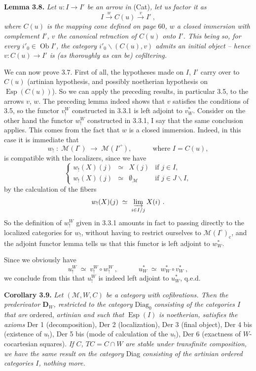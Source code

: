 \documentclass[11pt]{article}
\newcommand{\printedpage}[1]{\marginpar{\footnotesize p.~#1}}
\newcommand{\msp}[1]{\marginpar{\footnotesize [#1]}}
\newcommand{\Esp}{\operatorname{Esp}}
\newcommand{\Ob}{\operatorname{Ob}}
\newcommand{\M}{\mathcal{M}}
\begin{document}
\textbf{Lemma 3.8.} \textit{Let $u : I\longrightarrow I'$ be an arrow in} (Cat)\textit{, let us factor it as}
\[
I \xrightarrow{\;w\;} C(u) \xrightarrow{\;v\;} I'\ ,
\]
\textit{where $C(u)$ is the mapping cone defined on page} 60\textit{, $w$ a closed immersion with complement $I'$, $v$ the canonical retraction of $C(u)$ onto $I'$. This being so, for every $i'_0\in\Ob I'$, the category $i'_0\backslash(C(u),v)$ admits an initial object – hence $v : C(u)\longrightarrow I'$ is (as thoroughly as can be) cofiltering.}

We can now prove 3.7. First of all, the hypotheses made on $I$, $I'$ carry over to $C(u)$ (artinian hypothesis, and possibly noetherian hypothesis on $\Esp(C(u))$). So
\msp{page 63}
we can apply the preceding results, in particular 3.5, to the arrows $v$, $w$. The preceding lemma indeed shows that $v$ satisfies the conditions of 3.5, so the functor $v_!^W$ constructed in 3.3.1 is left adjoint to $v_W^*$. Consider on the other hand the functor $w_!^W$ constructed in 3.3.1, I say that the same conclusion applies. This comes from the fact that $w$ is a closed immersion. Indeed, in this case it is immediate that
\[
w_! \;:\; \M(I^\circ) \;\longrightarrow\; \M(I'^\circ), \qquad\quad \text{where } I = C(u), %
\]
is compatible with the localizers, since we have
\[
\left\{
\begin{array}{lcll}
w_!(X)(j) & \simeq & X(j) & \text{if } j\in I,\\[1ex]
w_!(X)(j) & \simeq & \emptyset_{\M} & \text{if } j\in J\backslash I,
\end{array}
\right.
\]
by the calculation of the fibers
\[
w_!(X)(j) \;\simeq\; \varinjlim_{i\in I/j} X(i)\ .
\]
So the definition of $w_!^W$ given in 3.3.1 amounts in fact to passing directly to the localized categories for $w_!$, without having to restrict ourselves to $\M(I^\circ)_{\mathrm{c}}$, and the adjoint functor lemma tells us that
\printedpage{32}
\msp{page 64}
this functor is left adjoint to $w_W^*$.

Since we obviously have
\[
u_!^W \;\simeq\; v_!^W\circ w_!^W\ , \qquad\quad u_W^* \;\simeq\; w_W^*\circ v_W^*\ ,
\]
we conclude from this that $u_!^W$ is indeed left adjoint to $u_W^*$, q.e.d.

\textbf{Corollary 3.9.} \textit{Let $(\M,W,C)$ be a category with cofibrations. Then the prederivator $\mathbf{D}_W$, restricted to the category} $\mathrm{Diag}_0$ \textit{consisting of the categories $I$ that are} ordered, \textit{artinian and such that} $\Esp(I)$ \textit{is noetherian, satisfies the axioms} Der 1 (decomposition), Der 2 (localization), Der 3 (final object), Der 4 bis (existence of $u_!$), Der 5 bis (mode of calculation of the $u_!$), Der 6 (exactness of $W$-cocartesian squares). \textit{If $C$, $TC = C\cap W$ are stable under transfinite composition, we have the same result on the category} Diag \textit{consisting of the artinian ordered categories $I$, nothing more.}
\end{document}
